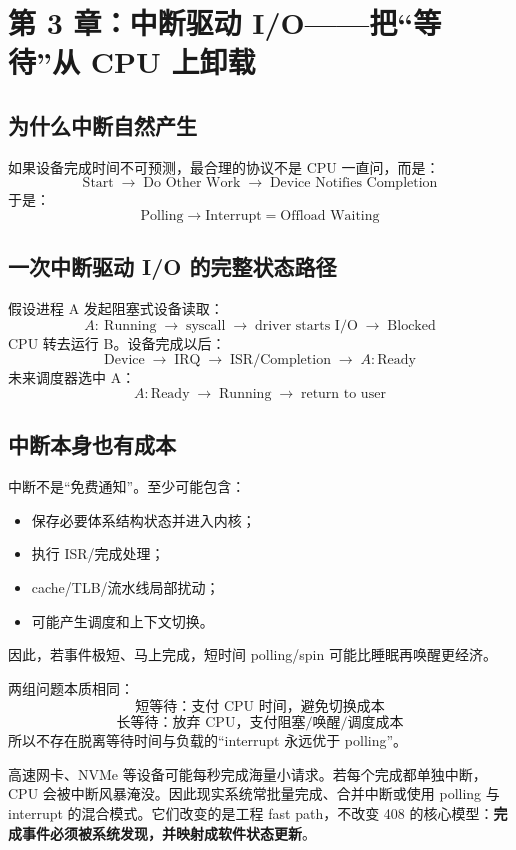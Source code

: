 \documentclass[11pt,a4paper]{ctexart}
\newcommand{\kw}[1]{\textbf{#1}}
\newcommand{\arr}{\;\longrightarrow\;}
\begin{document}
\section{第 3 章：中断驱动 I/O——把“等待”从 CPU 上卸载}

\subsection{为什么中断自然产生}
如果设备完成时间不可预测，最合理的协议不是 CPU 一直问，而是：
\[
\boxed{\text{Start}\arr\text{Do Other Work}\arr\text{Device Notifies Completion}}
\]
于是：
\[
\boxed{\text{Polling}\to\text{Interrupt}=\text{Offload Waiting}}
\]

\subsection{一次中断驱动 I/O 的完整状态路径}
假设进程 A 发起阻塞式设备读取：
\[
A:\ \text{Running}
\arr \text{syscall}
\arr \text{driver starts I/O}
\arr \text{Blocked}
\]
CPU 转去运行 B。设备完成以后：
\[
\text{Device}\arr\text{IRQ}\arr\text{ISR/Completion}\arr A:\text{Ready}
\]
未来调度器选中 A：
\[
A:\text{Ready}\arr\text{Running}\arr\text{return to user}
\]

\subsection{中断本身也有成本}
中断不是“免费通知”。至少可能包含：
\begin{itemize}
  \item 保存必要体系结构状态并进入内核；
  \item 执行 ISR/完成处理；
  \item cache/TLB/流水线局部扰动；
  \item 可能产生调度和上下文切换。
\end{itemize}
因此，若事件极短、马上完成，短时间 polling/spin 可能比睡眠再唤醒更经济。

\begin{bridge}[与并发专题同构：Polling vs Interrupt = Spin vs Sleep]
两组问题本质相同：
\[
\boxed{\text{短等待：支付 CPU 时间，避免切换成本}}
\]
\[
\boxed{\text{长等待：放弃 CPU，支付阻塞/唤醒/调度成本}}
\]
所以不存在脱离等待时间与负载的“interrupt 永远优于 polling”。
\end{bridge}

\begin{eng}
高速网卡、NVMe 等设备可能每秒完成海量小请求。若每个完成都单独中断，CPU 会被中断风暴淹没。因此现实系统常批量完成、合并中断或使用 polling 与 interrupt 的混合模式。它们改变的是工程 fast path，不改变 408 的核心模型：\kw{完成事件必须被系统发现，并映射成软件状态更新}。
\end{eng}
\end{document}
